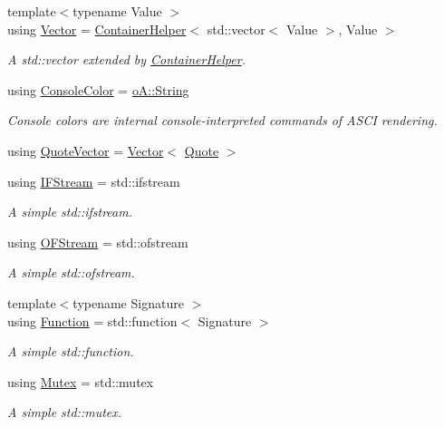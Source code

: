 \begin{DoxyCompactItemize}
{\footnotesize template$<$typename Value $>$ }\\using \mbox{\hyperlink{namespaceo_a_a10997b8f468dc32c0a3e5e2ff56c57c1}{Vector}} = \mbox{\hyperlink{classo_a_1_1_container_helper}{Container\+Helper}}$<$ std\+::vector$<$ Value $>$, Value $>$
\begin{DoxyCompactList}\small\item\em A std\+::vector extended by \mbox{\hyperlink{classo_a_1_1_container_helper}{Container\+Helper}}. \end{DoxyCompactList}\item 
using \mbox{\hyperlink{namespaceo_a_a747e07c1977a29f3e1d38683043ec927}{Console\+Color}} = \mbox{\hyperlink{classo_a_1_1_string}{o\+A\+::\+String}}
\begin{DoxyCompactList}\small\item\em Console colors are internal console-\/interpreted commands of A\+S\+CI rendering. \end{DoxyCompactList}\item 
using \mbox{\hyperlink{namespaceo_a_a38695044d9ec0b57190f4e3fab0caffd}{Quote\+Vector}} = \mbox{\hyperlink{namespaceo_a_a10997b8f468dc32c0a3e5e2ff56c57c1}{Vector}}$<$ \mbox{\hyperlink{classo_a_1_1_quote}{Quote}} $>$
\item 
using \mbox{\hyperlink{namespaceo_a_a5cea26f1078da3e5c2fc4529d6459c94}{I\+F\+Stream}} = std\+::ifstream
\begin{DoxyCompactList}\small\item\em A simple std\+::ifstream. \end{DoxyCompactList}\item 
using \mbox{\hyperlink{namespaceo_a_a1cab4a0d38a6bab1f5d1390d7a4b5b98}{O\+F\+Stream}} = std\+::ofstream
\begin{DoxyCompactList}\small\item\em A simple std\+::ofstream. \end{DoxyCompactList}\item 
{\footnotesize template$<$typename Signature $>$ }\\using \mbox{\hyperlink{namespaceo_a_a85bea86b9d05d2b86c77d8ee5b7bbde5}{Function}} = std\+::function$<$ Signature $>$
\begin{DoxyCompactList}\small\item\em A simple std\+::function. \end{DoxyCompactList}\item 
using \mbox{\hyperlink{namespaceo_a_adc2c4dfe90e78df47ae2e677a4d0f9fa}{Mutex}} = std\+::mutex
\begin{DoxyCompactList}\small\item\em A simple std\+::mutex. \end{DoxyCompactList}\item 

\end{DoxyCompactItemize}
